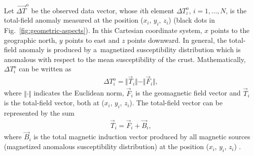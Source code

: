 \documentclass[journal abbreviation, npg]{copernicus}
\begin{document}
Let $\vec{\Delta T}^\mathrm{o}$ be the observed data vector, whose $i$th
element $\Delta T^\mathrm{o}_{i}$, $i = 1, \ldots, N$, is the total-field
anomaly measured at the position ($x_{i}$, $y_{i}$, $z_{i}$) (black dots in
Fig.~\ref{fig:geometric-aspects}). In this Cartesian coordinate system, $x$
points to the geographic north, $y$ points to east and $z$ points downward.
In general, the total-field anomaly is produced by a~magnetized
susceptibility distribution which is anomalous with respect to the mean
susceptibility of the crust. Mathematically, $\Delta T^\mathrm{o}_{i}$ can be
written as
\begin{align}
 &
\Delta T^\mathrm{o}_{i} = \Vert \vec{T}_i \Vert - \Vert \vec{F}_i \Vert ,
\label{eq:tfanomaly-i}
\end{align}
where $\Vert \cdot\Vert$ indicates the Euclidean norm, $\vec{F}_i$ is the
geomagnetic field vector and $\vec{T}_i$ is the total-field vector, both at
($x_{i}$, $y_{i}$, $z_{i}$). The total-field vector can be represented by the
sum
\begin{align}
 &
\vec{T}_i = \vec{F}_i + \vec{B}_i ,
\label{eq:tfvector-i}
\end{align}
where $\vec{B}_i$ is the total magnetic induction vector produced by all
magnetic sources (magnetized anomalous susceptibility distribution) at the
position ($x_{i}$, $y_{i}$, $z_{i}$) \citep{blakely1996,langel-hinze1998}.
\end{document}
